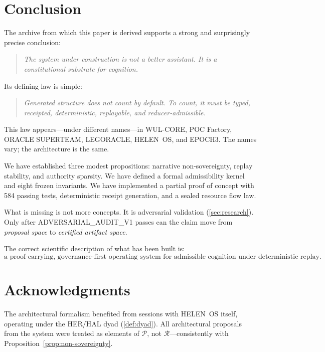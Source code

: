 \documentclass[11pt,a4paper]{article}
\theoremstyle{plain}
\theoremstyle{definition}
\theoremstyle{remark}
\newcommand{\Prop}{\mathcal{P}}
\newcommand{\Rec}{\mathcal{R}}
\begin{document}
\section{Conclusion}
\label{sec:conclusion}

The archive from which this paper is derived supports a strong and
surprisingly precise conclusion:

\begin{quote}
  \textit{The system under construction is not a better assistant.
  It is a constitutional substrate for cognition.}
\end{quote}

Its defining law is simple:
\begin{quote}
  \textit{Generated structure does not count by default.
  To count, it must be typed, receipted, deterministic, replayable,
  and reducer-admissible.}
\end{quote}

This law appears---under different names---in WUL-CORE, POC Factory,
ORACLE SUPERTEAM, LEGORACLE, HELEN~OS, and EPOCH3.
The names vary; the architecture is the same.

We have established three modest propositions: narrative non-sovereignty,
replay stability, and authority sparsity.
We have defined a formal admissibility kernel and eight frozen invariants.
We have implemented a partial proof of concept with 584 passing tests,
deterministic receipt generation, and a sealed resource flow law.

What is missing is not more concepts.
It is adversarial validation (\cref{sec:research}).
Only after ADVERSARIAL\_AUDIT\_V1 passes can the claim move from
\emph{proposal space} to \emph{certified artifact space}.

\bigskip
\noindent
The correct scientific description of what has been built is:
\[
  \text{a proof-carrying, governance-first operating system}
  \text{ for admissible cognition under deterministic replay.}
\]

\section*{Acknowledgments}
The architectural formalism benefited from sessions with HELEN~OS itself,
operating under the HER/HAL dyad (\cref{def:dyad}).
All architectural proposals from the system were treated as elements of
$\Prop$, not $\Rec$---consistently with Proposition~\ref{prop:non-sovereignty}.
\end{document}
